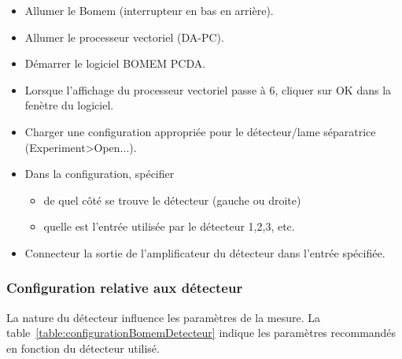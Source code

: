 \documentclass[11pt,francais]{book} %
\begin{document}
\begin{itemize}
\item Allumer le Bomem (interrupteur en bas en arrière).
\item Allumer le processeur vectoriel (DA-PC).
\item Démarrer le logiciel BOMEM PCDA.
\item Lorsque l'affichage du processeur vectoriel passe à 6, cliquer sur OK dans la fenètre du logiciel.
\item Charger une configuration appropriée pour le détecteur/lame séparatrice (Experiment>Open...).
\item Dans la configuration, spécifier
  \begin{itemize}
    \item de quel côté se trouve le détecteur (gauche ou droite)
    \item quelle est l'entrée utilisée par le détecteur 1,2,3, etc.
  \end{itemize}
\item Connecteur la sortie de l'amplificateur du détecteur dans l'entrée spécifiée.
\end{itemize}

\subsubsection{Configuration relative aux détecteur}

La nature du détecteur influence les paramètres de la mesure.
La table~\ref{table:configurationBomemDetecteur} indique les paramètres recommandés en fonction du détecteur utilisé.
\end{document}
